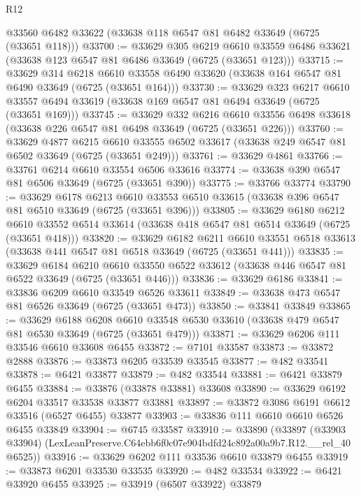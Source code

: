 \begin{lexlean}{R12}
\begin{coremodule}
    @33560
    @6482
    @33622
    (@33638 @118 @6547 @81 @6482 @33649 (@6725 (@33651 @118)))
@33700 := @33629
    @305
    @6219
    @6610
    @33559
    @6486
    @33621
    (@33638 @123 @6547 @81 @6486 @33649 (@6725 (@33651 @123)))
@33715 := @33629
    @314
    @6218
    @6610
    @33558
    @6490
    @33620
    (@33638 @164 @6547 @81 @6490 @33649 (@6725 (@33651 @164)))
@33730 := @33629
    @323
    @6217
    @6610
    @33557
    @6494
    @33619
    (@33638 @169 @6547 @81 @6494 @33649 (@6725 (@33651 @169)))
@33745 := @33629
    @332
    @6216
    @6610
    @33556
    @6498
    @33618
    (@33638 @226 @6547 @81 @6498 @33649 (@6725 (@33651 @226)))
@33760 := @33629
    @4877
    @6215
    @6610
    @33555
    @6502
    @33617
    (@33638 @249 @6547 @81 @6502 @33649 (@6725 (@33651 @249)))
@33761 := @33629 @4861
@33766 := @33761 @6214 @6610 @33554 @6506 @33616
@33774 := @33638 @390 @6547 @81 @6506 @33649 (@6725 (@33651 @390))
@33775 := @33766 @33774
@33790 := @33629
    @6178
    @6213
    @6610
    @33553
    @6510
    @33615
    (@33638 @396 @6547 @81 @6510 @33649 (@6725 (@33651 @396)))
@33805 := @33629
    @6180
    @6212
    @6610
    @33552
    @6514
    @33614
    (@33638 @418 @6547 @81 @6514 @33649 (@6725 (@33651 @418)))
@33820 := @33629
    @6182
    @6211
    @6610
    @33551
    @6518
    @33613
    (@33638 @441 @6547 @81 @6518 @33649 (@6725 (@33651 @441)))
@33835 := @33629
    @6184
    @6210
    @6610
    @33550
    @6522
    @33612
    (@33638 @446 @6547 @81 @6522 @33649 (@6725 (@33651 @446)))
@33836 := @33629 @6186
@33841 := @33836 @6209 @6610 @33549 @6526 @33611
@33849 := @33638 @473 @6547 @81 @6526 @33649 (@6725 (@33651 @473))
@33850 := @33841 @33849
@33865 := @33629
    @6188
    @6208
    @6610
    @33548
    @6530
    @33610
    (@33638 @479 @6547 @81 @6530 @33649 (@6725 (@33651 @479)))
@33871 := @33629 @6206 @111 @33546 @6610 @33608 @6455
@33872 := @7101 @33587
@33873 := @33872 @2888
@33876 := @33873 @6205 @33539 @33545
@33877 := @482 @33541
@33878 := @6421 @33877
@33879 := @482 @33544
@33881 := @6421 @33879 @6455
@33884 := @33876 (@33878 @33881) @33608
@33890 := @33629 @6192 @6204 @33517 @33538 @33877 @33881
@33897 := @33872 @3086 @6191 @6612 @33516 (@6527 @6455) @33877
@33903 := @33836 @111 @6610 @6610 @6526 @6455 @33849
@33904 := @6745 @33587
@33910 := @33890
    (@33897 (@33903 @33904) (LexLeanPreserve.C64ebb6f0c07e904bdfd24c892a00a9b7.R12.__rel_40 @6525))
@33916 := @33629 @6202 @111 @33536 @6610 @33879 @6455
@33919 := @33873 @6201 @33530 @33535
@33920 := @482 @33534
@33922 := @6421 @33920 @6455
@33925 := @33919 (@6507 @33922) @33879

\end{coremodule}
\end{lexlean}
